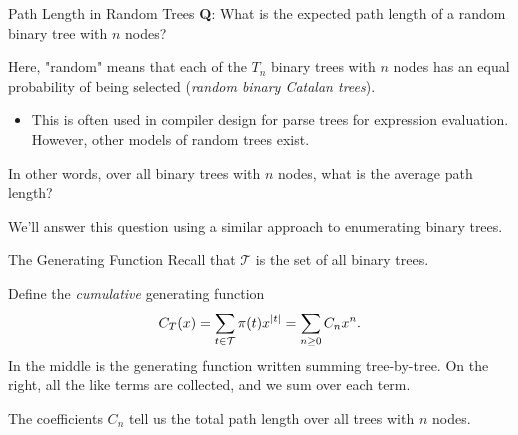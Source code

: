 \documentclass[aspectratio=169]{beamer}
\newcommand{\TT}{\mathcal{T}}
\begin{document}
\begin{frame}{Path Length in Random Trees}
  \textbf{\textcolor{sigma@mainblue}{Q}}: What is the expected path length of a random binary tree with $n$ nodes? \cite{algoanalysis}
  
  Here, "random" means that each of the $T_n$ binary trees with $n$ nodes has an equal probability of being selected (\textit{random binary Catalan trees}). \pause
  \begin{itemize}
    \item This is often used in compiler design for parse trees for expression evaluation.
    However, other models of random trees exist.
  \end{itemize} \pause
  In other words, over all binary trees with $n$ nodes, what is the average path length?

  We'll answer this question using a similar approach to enumerating binary trees.
\end{frame}





\begin{frame}{The Generating Function}
  Recall that $\TT$ is the set of all binary trees.

  Define the \textit{cumulative} generating function
  \[C_T(x) = \sum_{t \in \TT} \pi(t) x^{\abs{t}}
  = \sum_{n \ge 0} C_{n} x^n.\] \pause
  In the middle is the generating function written summing tree-by-tree.
  On the right, all the like terms are collected, and we sum over each term.

  The coefficients $C_{n}$ tell us the total path length over all trees with $n$ nodes.
\end{frame}
\end{document}

